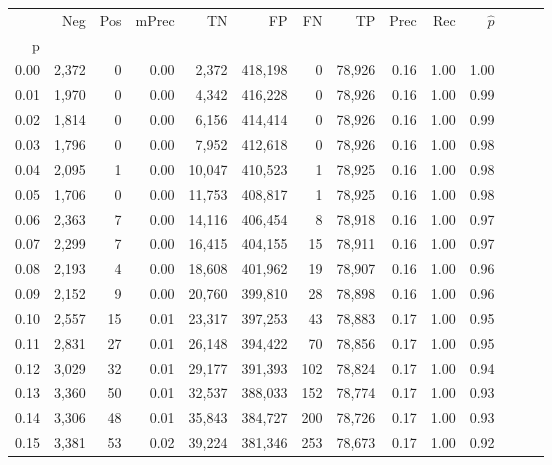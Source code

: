 \begin{tabular}{rrrrrrrrrrrrrr}
\toprule
{} &    Neg &    Pos & mPrec &       TN &       FP &      FN &      TP &  Prec &   Rec & $\hat{p}$ \\
p    &        &        &       &          &          &         &         &       &       &           \\
\midrule
0.00 &  2,372 &      0 &  0.00 &    2,372 &  418,198 &       0 &  78,926 &  0.16 &  1.00 &      1.00 \\
0.01 &  1,970 &      0 &  0.00 &    4,342 &  416,228 &       0 &  78,926 &  0.16 &  1.00 &      0.99 \\
0.02 &  1,814 &      0 &  0.00 &    6,156 &  414,414 &       0 &  78,926 &  0.16 &  1.00 &      0.99 \\
0.03 &  1,796 &      0 &  0.00 &    7,952 &  412,618 &       0 &  78,926 &  0.16 &  1.00 &      0.98 \\
0.04 &  2,095 &      1 &  0.00 &   10,047 &  410,523 &       1 &  78,925 &  0.16 &  1.00 &      0.98 \\
0.05 &  1,706 &      0 &  0.00 &   11,753 &  408,817 &       1 &  78,925 &  0.16 &  1.00 &      0.98 \\
0.06 &  2,363 &      7 &  0.00 &   14,116 &  406,454 &       8 &  78,918 &  0.16 &  1.00 &      0.97 \\
0.07 &  2,299 &      7 &  0.00 &   16,415 &  404,155 &      15 &  78,911 &  0.16 &  1.00 &      0.97 \\
0.08 &  2,193 &      4 &  0.00 &   18,608 &  401,962 &      19 &  78,907 &  0.16 &  1.00 &      0.96 \\
0.09 &  2,152 &      9 &  0.00 &   20,760 &  399,810 &      28 &  78,898 &  0.16 &  1.00 &      0.96 \\
0.10 &  2,557 &     15 &  0.01 &   23,317 &  397,253 &      43 &  78,883 &  0.17 &  1.00 &      0.95 \\
0.11 &  2,831 &     27 &  0.01 &   26,148 &  394,422 &      70 &  78,856 &  0.17 &  1.00 &      0.95 \\
0.12 &  3,029 &     32 &  0.01 &   29,177 &  391,393 &     102 &  78,824 &  0.17 &  1.00 &      0.94 \\
0.13 &  3,360 &     50 &  0.01 &   32,537 &  388,033 &     152 &  78,774 &  0.17 &  1.00 &      0.93 \\
0.14 &  3,306 &     48 &  0.01 &   35,843 &  384,727 &     200 &  78,726 &  0.17 &  1.00 &      0.93 \\
0.15 &  3,381 &     53 &  0.02 &   39,224 &  381,346 &     253 &  78,673 &  0.17 &  1.00 &      0.92 \\

\end{tabular}
